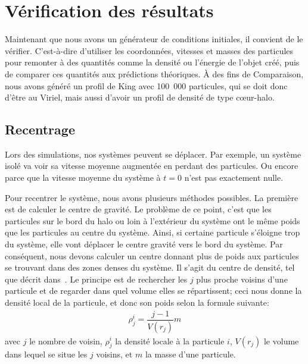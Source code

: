 	\section{Vérification des résultats\label{Verif_gene}}

		Maintenant que nous avons un générateur de conditions
		initiales, il convient de le vérifier. C'est-à-dire d'utiliser
		les coordonnées, vitesses et masses des particules pour
		remonter à des quantités comme la densité ou l'énergie de
		l'objet créé, puis de comparer ces quantités aux prédictions
		théoriques. À des fins de Comparaison, nous avons généré un
		profil de King avec \mbox{100 000} particules, qui se doit donc d'être
		au Viriel, mais aussi d'avoir un profil de densité de type cœur-halo.


		\subsection{Recentrage}

			Lors des simulations, nos systèmes peuvent se déplacer. Par exemple, un système isolé va voir sa
			vitesse moyenne augmentée en perdant des particules. Ou encore parce que la vitesse moyenne du
			système à $t=0$ n'est pas exactement nulle.

			Pour recentrer le système, nous avons plusieurs méthodes possibles. La première est de calculer
			le centre de gravité. Le problème de ce point, c'est que les particules sur le bord du halo ou
			loin à l'extérieur du système ont le même poids que les particules au centre du système. Ainsi,
			si certaine particule s'éloigne trop du système, elle vont déplacer le centre gravité vers le
			bord du système. Par conséquent, nous devons calculer un centre donnant plus de poids aux
			particules se trouvant dans des zones denses du système. Il s'agit du centre de densité, tel que
			décrit dans~\cite{1985ApJ...298...80C}. Le principe est de rechercher les $j$ plus proche voisins
			d'une particule et de regarder dans quel volume elles se répartissent; ceci nous donne la
			densité local de la particule, et donc son poids selon la formule suivante:
			\begin{align}
				\rho_j^i = \dfrac{j-1}{V(r_j)}m
			\end{align}
			avec $j$ le nombre de voisin, $\rho_j^i$ la densité locale à la particule $i$, $V(r_j)$ le volume
			dans lequel se situe les $j$ voisins, et $m$ la masse d'une particule.

